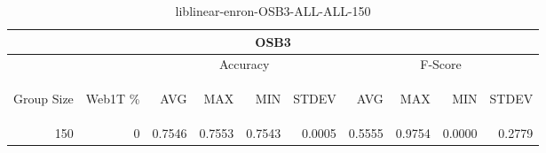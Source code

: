 \begin{center}
\begin{table}[htbp]
\begin{tabular}{ | r | r | r | r | r | r | r | r | r | r |}
\hline
\multicolumn{10}{|c|}{OSB3}\\
\hline
 & & \multicolumn{4}{|c|}{Accuracy} & \multicolumn{4}{|c|}{F-Score}\\ \cline{3-10}
\begin{sideways}Group Size\end{sideways} & \begin{sideways}Web1T \%\end{sideways} & \begin{sideways}AVG\end{sideways} & \begin{sideways}MAX\end{sideways} & \begin{sideways}MIN\end{sideways} & \begin{sideways}STDEV\end{sideways} & \begin{sideways}AVG\end{sideways} & \begin{sideways}MAX\end{sideways} & \begin{sideways}MIN\end{sideways} & \begin{sideways}STDEV\end{sideways}\\
\hline
\multirow{1}{*}{150}
 & 0 & 0.7546 & 0.7553 & 0.7543 & 0.0005 & 0.5555 & 0.9754 & 0.0000 & 0.2779\\ \cline{2-10}
\hline
\end{tabular}
\caption{liblinear-enron-OSB3-ALL-ALL-150}
\end{table}
\end{center}

